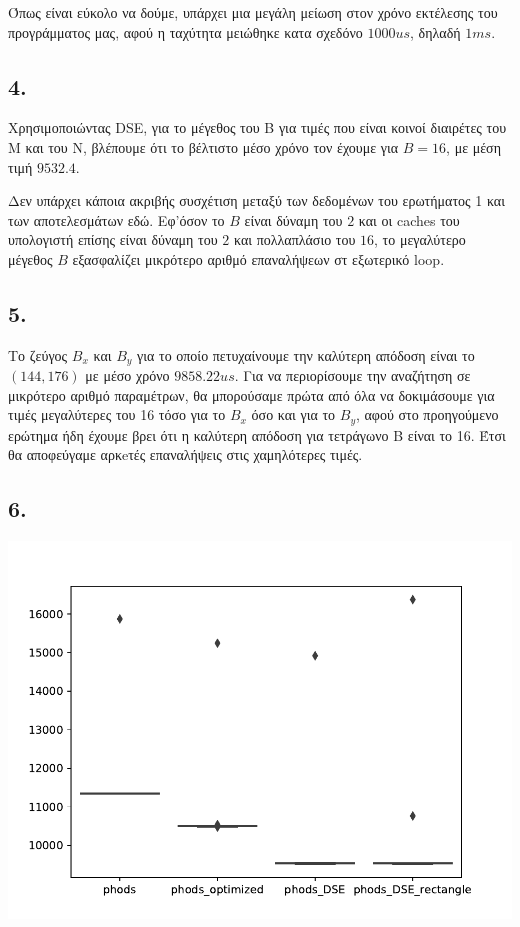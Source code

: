 \documentclass{article}
\newcommand{\english}[1]{\foreignlanguage{english}{{#1}}}
\begin{document}
Όπως είναι εύκολο να δούμε, υπάρχει μια μεγάλη μείωση στον χρόνο εκτέλεσης του προγράμματος μας, αφού η ταχύτητα μειώθηκε κατα σχεδόνο \english{$1000us$}, δηλαδή \english{$1ms$}.

\subsection*{4.}

Χρησιμοποιώντας \english{DSE}, για το μέγεθος του \english{B} για τιμές που είναι κοινοί διαιρέτες του M και του Ν, βλέπουμε ότι το βέλτιστο μέσο χρόνο τον έχουμε για $B = 16$, με μέση τιμή $9532.4$.

Δεν υπάρχει κάποια ακριβής συσχέτιση μεταξύ των δεδομένων του ερωτήματος 1 και των αποτελεσμάτων εδώ. Εφ'όσον το \english{$B$} είναι δύναμη του $2$ και οι \english{caches} του υπολογιστή επίσης είναι δύναμη του $2$ και πολλαπλάσιο του $16$, το μεγαλύτερο μέγεθος \english{$B$} εξασφαλίζει μικρότερο αριθμό επαναλήψεων στ εξωτερικό \english{loop}.

\subsection*{5.}
Το ζεύγος \english{$B_x$} και \english{$B_y$} για το οποίο πετυχαίνουμε την καλύτερη απόδοση είναι το $(144, 176)$ με μέσο χρόνο \english{$9858.22us$}.
Για να περιορίσουμε την αναζήτηση σε μικρότερο αριθμό παραμέτρων, θα μπορούσαμε πρώτα από όλα να δοκιμάσουμε για τιμές μεγαλύτερες του 16 τόσο για το \english{$B_x$} όσο και για το \english{$B_y$}, αφού στο προηγούμενο ερώτημα ήδη έχουμε βρει ότι η καλύτερη απόδοση για τετράγωνο Β είναι το 16. Έτσι θα αποφεύγαμε αρκeτές επαναλήψεις στις χαμηλότερες τιμές.

\subsection*{6.}
\includegraphics[scale=0.65]{Part1/results/results_boxplots.pdf}
\end{document}
